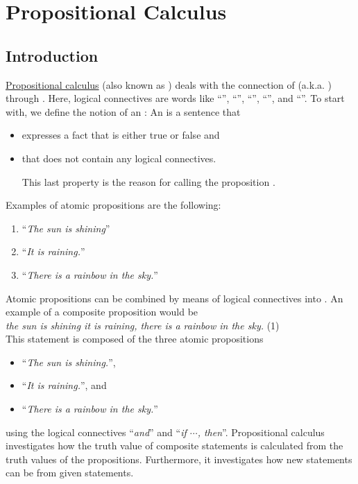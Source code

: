 \chapter{Propositional Calculus}
\section{Introduction}
\href{https://en.wikipedia.org/wiki/Propositional_calculus}{Propositional calculus}
(also known as ) deals with the connection of
(a.k.a. ) through 
.  Here, logical connectives are words like ``'', ``'',
``'', ``'', and ``''.  To
start with, we define the notion of an : An
 is a sentence  that 
\begin{itemize}
\item expresses a fact that is either true or false and
\item that does not contain any logical connectives.

      This last property is the reason for calling the proposition .
\end{itemize}
Examples of atomic propositions are the following:
\begin{enumerate}
\item ``\textsl{The sun is shining}''
\item ``\textsl{It is raining.}''
\item ``\textsl{There is a rainbow in the sky.}''
\end{enumerate}
Atomic propositions can be combined by means of logical connectives
into .  An example of a
composite proposition would be
\\[0.2cm] 
\hspace*{1.3cm}
\textsl{ the sun is shining  it is raining,  there is a rainbow in the sky.} 
\hspace*{\fill} (1)
\\[0.2cm]
This statement is composed of the three atomic propositions
\begin{itemize}
\item ``\textsl{The sun is shining.}'', 
\item ``\textsl{It is raining.}'', and
\item ``\textsl{There is a rainbow in the sky.}''
\end{itemize}
using the logical connectives ``\textsl{and}'' and ``\textsl{if $\cdots$, then}''.
Propositional calculus investigates how the truth value of composite statements is
calculated from the truth values of the propositions.  Furthermore, it investigates
how new statements can be  from given statements. 

